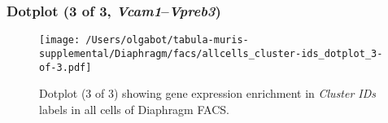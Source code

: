 \clearpage

\subsubsection{Dotplot (3 of 3, \emph{Vcam1}--\emph{Vpreb3})}
\begin{figure}[h]
\centering
\texttt{[image: /Users/olgabot/tabula-muris-supplemental/Diaphragm/facs/allcells\_cluster-ids\_dotplot\_3-of-3.pdf]}

\caption{ Dotplot (3 of 3)  showing gene expression enrichment in \emph{Cluster IDs} labels in all cells of Diaphragm FACS. }
\end{figure}

